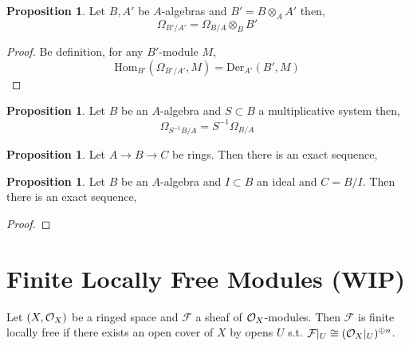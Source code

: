 \documentclass[12pt]{extarticle}
\newcommand{\Hom}[3]{\mathrm{Hom}_{#1}\left( #2, #3 \right)}
\theoremstyle{definition}
\newtheorem{proposition}[theorem]{Proposition}
\newenvironment{definition}[1][Definition:]{\begin{trivlist}
\item[\hskip \labelsep {\bfseries #1}]}{\end{trivlist}}
\newcommand{\F}{\mathcal{F}}
\begin{document}
\begin{proposition}
Let $B, A'$ be $A$-algebras and $B' = B \otimes_A A'$ then,
\[ \Omega_{B' / A'} = \Omega_{B / A} \otimes_B B' \]
\end{proposition}

\newcommand{\Der}[3]{\mathrm{Der}_{#1} \left(#2, #3\right)}

\begin{proof}
Be definition, for any $B'$-module $M$,
\[ \Hom{B'}{\Omega_{B'/A'}}{M} = \Der{A'}{B'}{M} \]
\end{proof}

\begin{proposition}
Let $B$ be an $A$-algebra and $S \subset B$ a multiplicative system then,
\[ \Omega_{S^{-1} B / A} = S^{-1} \Omega_{B/A} \]
\end{proposition}

\begin{proposition}
Let $A \to B \to C$ be rings. Then there is an exact sequence,
\begin{center}
\end{center}
\end{proposition}

\begin{proposition}
Let $B$ be an $A$-algebra and $I \subset B$ an ideal and $C = B / I$. Then there is an exact sequence,
\begin{center}
\end{center}
\end{proposition}

\begin{proof}

\end{proof}

\section{Finite Locally Free Modules (WIP)}

\begin{definition}
Let $(X, \mathcal{O}_{X})$ be a ringed space and $\F$ a sheaf of $\mathcal{O}_{X}$-modules. Then $\F$ is finite locally free if there exists an open cover of $X$ by opens $U$ s.t. $\F|_U \cong (\struct{X}|_U)^{\oplus n}$. 
\end{definition}
\end{document}
